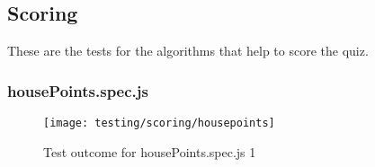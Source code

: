 \subsection{Scoring}
These are the tests for the algorithms that help to score the quiz.

\subsubsection{housePoints.spec.js} %
\label{ssub:housepoints_spec_js}

\begin{figure}[h!]
  \texttt{[image: testing/scoring/housepoints]}
  \caption{Test outcome for housePoints.spec.js 1}
\end{figure}
